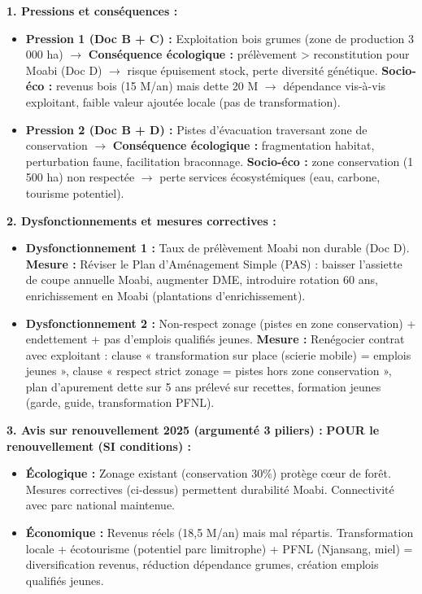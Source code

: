 \documentclass[11pt]{article}
\newcommand{\cle}[1]{{\popxbold\color{popdark}#1}}
\begin{document}
\begin{corrige}
\textbf{1. Pressions et conséquences :}
\begin{itemize}
    \item \textbf{Pression 1 (Doc B + C) :} Exploitation bois grumes (zone de production 3 000 ha) $\rightarrow$ \textbf{Conséquence écologique :} prélèvement > reconstitution pour Moabi (Doc D) $\rightarrow$ risque épuisement stock, perte diversité génétique. \textbf{Socio-éco :} revenus bois (15 M/an) mais dette 20 M $\rightarrow$ dépendance vis-à-vis exploitant, faible valeur ajoutée locale (pas de transformation).
    \item \textbf{Pression 2 (Doc B + D) :} Pistes d'évacuation traversant zone de conservation $\rightarrow$ \textbf{Conséquence écologique :} fragmentation habitat, perturbation faune, facilitation braconnage. \textbf{Socio-éco :} zone conservation (1 500 ha) non respectée $\rightarrow$ perte services écosystémiques (eau, carbone, tourisme potentiel).
\end{itemize}
\textbf{2. Dysfonctionnements et mesures correctives :}
\begin{itemize}
    \item \textbf{Dysfonctionnement 1 :} Taux de prélèvement Moabi non durable (Doc D). \textbf{Mesure :} Réviser le \cle{Plan d'Aménagement Simple (PAS)} : baisser l'assiette de coupe annuelle Moabi, augmenter DME, introduire rotation 60 ans, enrichissement en Moabi (plantations d'enrichissement).
    \item \textbf{Dysfonctionnement 2 :} Non-respect zonage (pistes en zone conservation) + endettement + pas d'emplois qualifiés jeunes. \textbf{Mesure :} Renégocier contrat avec exploitant : clause « transformation sur place (scierie mobile) = emplois jeunes », clause « respect strict zonage = pistes hors zone conservation », plan d'apurement dette sur 5 ans prélevé sur recettes, formation jeunes (garde, guide, transformation PFNL).
\end{itemize}
\textbf{3. Avis sur renouvellement 2025 (argumenté 3 piliers) :}
\textbf{POUR le renouvellement (SI conditions) :}
\begin{itemize}
    \item \textbf{Écologique :} Zonage existant (conservation 30\%) protège cœur de forêt. Mesures correctives (ci-dessus) permettent durabilité Moabi. Connectivité avec parc national maintenue.
    \item \textbf{Économique :} Revenus réels (18,5 M/an) mais mal répartis. Transformation locale + écotourisme (potentiel parc limitrophe) + PFNL (Njansang, miel) = diversification revenus, réduction dépendance grumes, création emplois qualifiés jeunes.

\end{itemize}
\end{corrige}
\end{document}
